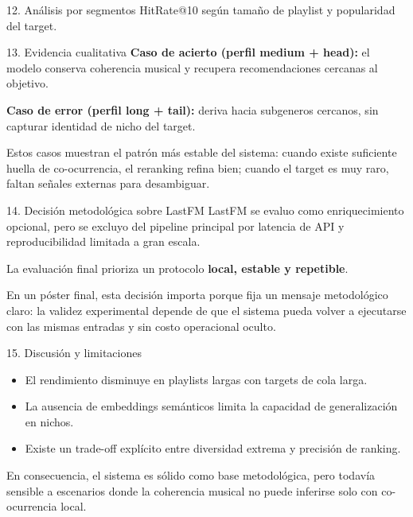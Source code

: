 ﻿\documentclass[final]{beamer}
\newlength{\colwidth}
\begin{document}
\begin{frame}[t]
\begin{columns}[t]
\begin{column}{\colwidth}
\begin{block}{12. Análisis por segmentos}
\vspace{0.08cm}
\small HitRate@10 según tamaño de playlist y popularidad del target.
\end{block}

\begin{block}{13. Evidencia cualitativa}
\textbf{Caso de acierto (perfil medium + head):} el modelo conserva coherencia musical y recupera recomendaciones cercanas al objetivo.

\vspace{0.18cm}
\textbf{Caso de error (perfil long + tail):} deriva hacia subgeneros cercanos, sin capturar identidad de nicho del target.

\vspace{0.18cm}
Estos casos muestran el patrón más estable del sistema: cuando existe suficiente huella de co-ocurrencia, el reranking refina bien; cuando el target es muy raro, faltan señales externas para desambiguar.
\end{block}

\begin{alertblock}{14. Decisión metodológica sobre LastFM}
LastFM se evaluo como enriquecimiento opcional, pero se excluyo del pipeline principal por latencia de API y reproducibilidad limitada a gran escala.

La evaluación final prioriza un protocolo \textbf{local, estable y repetible}.

En un póster final, esta decisión importa porque fija un mensaje metodológico claro: la validez experimental depende de que el sistema pueda volver a ejecutarse con las mismas entradas y sin costo operacional oculto.
\end{alertblock}

\begin{block}{15. Discusión y limitaciones}
\begin{itemize}
  \item El rendimiento disminuye en playlists largas con targets de cola larga.
  \item La ausencia de embeddings semánticos limita la capacidad de generalización en nichos.
  \item Existe un trade-off explícito entre diversidad extrema y precisión de ranking.
\end{itemize}

\vspace{0.04cm}
En consecuencia, el sistema es sólido como base metodológica, pero todavía sensible a escenarios donde la coherencia musical no puede inferirse solo con co-ocurrencia local.
\end{block}


\end{column}
\end{columns}
\end{frame}
\end{document}
